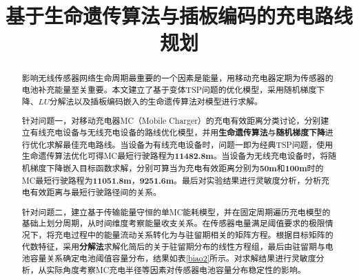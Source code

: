 \documentclass{whutmod}
\title{基于生命遗传算法与插板编码的充电路线规划}
\begin{document}
	\maketitle
	\thispagestyle{empty}
	\begin{abstract}
	    影响无线传感器网络生命周期最重要的一个因素是能量，用移动充电器定期为传感器的电池补充能量至关重要。本文建立了基于变体TSP问题的优化模型，采用随机梯度下降、$LU$分解法以及插板编码嵌入的生命遗传算法对模型进行求解。
	
		针对问题一，对移动充电器MC（Mobile Charger）的充电有效距离分类讨论，分别建立有线充电设备与无线充电设备的路线优化模型，并用\textbf{生命遗传算法}与\textbf{随机梯度下降}进行优化求解最佳充电路线。当设备为有线充电设备时，问题一即为经典TSP问题，使用生命遗传算法优化可得MC最短行驶路程为\textbf{11482.8m}。当设备为无线充电设备时，将随机梯度下降嵌入目标函数求解，分别可算当为充电有效距离分别为\textbf{50m}和\textbf{100m}时的MC最短行驶路程为\textbf{11051.8m}，\textbf{9251.6m}。最后对实验结果进行灵敏度分析，分析充电有效距离与最短行驶路径间的关系。
		
		
		针对问题二，建立基于传输能量守恒的单MC能耗模型，并在固定周期遍历充电模型的基础上划分周期，从时间维度考察能量收支关系。在传感器电量满足阈值要求的极限情况下，将充电过程中的能量流动关系转化为与驻留期相关的矩阵方程。根据目标矩阵的代数特征，采用\textbf{分解法}求解化简后的关于驻留期分布的线性方程组，最后由驻留期与电池容量关系确定电池阈值容量分布，结果如表\ref{biao2}所示。对求解结果进行灵敏度分析，从实际角度考察MC充电半径等因素对传感器电池容量分布稳定性的影响。
		

\end{abstract}
\end{document}
